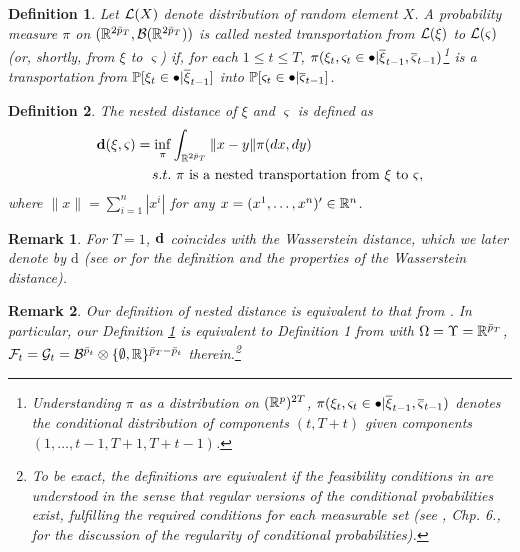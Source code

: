 \documentclass{article}              %
\newtheorem{definition}{Definition}
\newtheorem{remark}{Remark}
\begin{document}
\begin{definition}
\label{dt} Let $\mathcal{L}(X)$ denote distribution of random element $X$. A probability measure $\pi$
on $(\mathbb{R}^{2\bar{p}_{T}},\mathcal{B}(\mathbb{R}^{2\bar{p}_{T}}))$ 
is called \emph{nested transportation} from $\mathcal{L}(\xi)$ to $\mathcal{L}(\varsigma)$ (or, shortly, from $\xi$ to $\varsigma$)
if, for each $1\leq t\leq T$, $\pi(\xi_{t},\varsigma_{t}\in\bullet|\overline{\xi}_{t-1},\overline{\varsigma}_{t-1})$\footnote{Understanding $\pi$ as a distribution on $(\mathbb{R}^p)^{2T}$, $\pi(\xi_{t},\varsigma_{t}\in\bullet|\overline{\xi}_{t-1},\overline{\varsigma}_{t-1})$ denotes the conditional distribution of components $(t,T+t)$ given components $(1,\dots,t-1,T+1,T+t-1)$.}
 is a transportation from $\mathbb{P}[\xi_{t}\in\bullet|\overline{\xi}_{t-1}]$ into
$\mathbb{P}[\varsigma_{t}\in\bullet|\overline{\varsigma}_{t-1}]$.
\end{definition}

\begin{definition}
\label{def:d} The \emph{nested distance} of $\xi$ and $\varsigma$
is defined as
\begin{align*}
\mathbf{d}(\xi,\varsigma)=\inf_{\pi} & \int_{\mathbb{R}^{2\bar{p}_{T}}}\|x-y\|\pi(dx,dy)\\
s.t. & \text{ \ensuremath{\pi} is a nested transportation from \ensuremath{\xi\ }to \ensuremath{\varsigma}},
\end{align*}
where $\|x\|=\sum_{i=1}^{n}|x^{i}|$  for any $x = (x^1,\dots,x^n)'\in \mathbb{R}^n$.
\end{definition}

\begin{remark}
For $T=1$, $\mathbf{d}$ coincides with the Wasserstein distance, which we
later denote by $\mathrm{d}$ (see \cite{pflug2014multistage} or
\cite{villani2003topics} for the definition and the properties of
the Wasserstein distance).
\end{remark}

\begin{remark}
\label{rem:cpp}Our definition of nested distance is equivalent to that from \cite{pflug2012distance}. In particular, our Definition \ref{dt} is equivalent to Definition 1 from \cite{pflug2012distance} with $\Omega=\Upsilon=\mathbb{R}^{\bar{p}_{T}}$, $\mathcal{F}_{t}=\mathcal{G}_{t}=\mathcal{B}^{\bar{p}_{t}}\otimes\{\emptyset,\mathbb{R}\}^{\bar{p}_{T}-\bar{p}_{t}}$ therein.\footnote{To be exact, the definitions are equivalent if the feasibility conditions
in \cite{pflug2012distance} are understood in the sense that regular
versions of the conditional probabilities exist, fulfilling the required
conditions for each measurable set (see \cite{Kallenberg02}, Chp.
6., for the discussion of the regularity of conditional probabilities).}
\end{remark}
\end{document}
